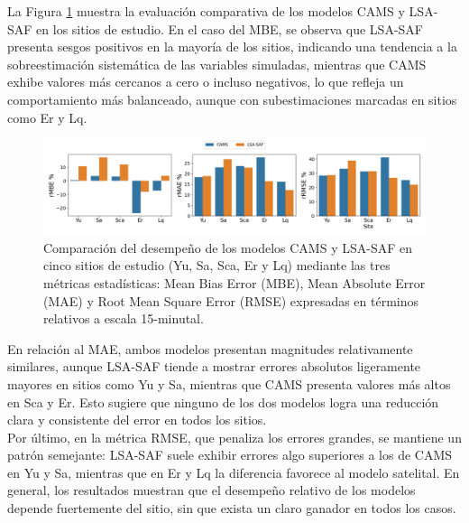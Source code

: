 La Figura \ref{fig:general-15} muestra la evaluación comparativa de los modelos CAMS y LSA-SAF en los sitios de estudio. En el caso del MBE, se observa que LSA-SAF presenta sesgos positivos en la mayoría de los sitios, indicando una tendencia a la sobreestimación sistemática de las variables simuladas, mientras que CAMS exhibe valores más cercanos a cero o incluso negativos, lo que refleja un comportamiento más balanceado, aunque con subestimaciones marcadas en sitios como Er y Lq.


\begin{figure}
    \centering
    \includegraphics[width=\linewidth]{figuras/errors_15.png}
    \caption{Comparación del desempeño de los modelos CAMS y LSA-SAF en cinco sitios de estudio (Yu, Sa, Sca, Er y Lq) mediante las tres métricas estadísticas: Mean Bias Error (MBE), Mean Absolute Error (MAE) y Root Mean Square Error (RMSE) expresadas en términos relativos a escala 15-minutal.}
    \label{fig:general-15}
\end{figure}

En relación al MAE, ambos modelos presentan magnitudes relativamente similares, aunque LSA-SAF tiende a mostrar errores absolutos ligeramente mayores en sitios como Yu y Sa, mientras que CAMS presenta valores más altos en Sca y Er. Esto sugiere que ninguno de los dos modelos logra una reducción clara y consistente del error en todos los sitios.\\

Por último, en la métrica RMSE, que penaliza los errores grandes, se mantiene un patrón semejante: LSA-SAF suele exhibir errores algo superiores a los de CAMS en Yu y Sa, mientras que en Er y Lq la diferencia favorece al modelo satelital. En general, los resultados muestran que el desempeño relativo de los modelos depende fuertemente del sitio, sin que exista un claro ganador en todos los casos.\\


